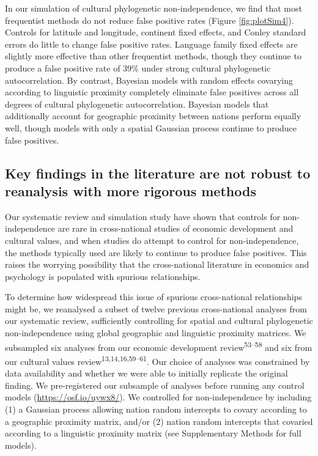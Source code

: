 \documentclass[
  man,floatsintext]{apa6}
\begin{document}
In our simulation of cultural phylogenetic non-independence, we find that most frequentist methods do not reduce false positive rates (Figure \ref{fig:plotSim4}). Controls for latitude and longitude, continent fixed effects, and Conley standard errors do little to change false positive rates. Language family fixed effects are slightly more effective than other frequentist methods, though they continue to produce a false positive rate of 39\% under strong cultural phylogenetic autocorrelation. By contrast, Bayesian models with random effects covarying according to linguistic proximity completely eliminate false positives across all degrees of cultural phylogenetic autocorrelation. Bayesian models that additionally account for geographic proximity between nations perform equally well, though models with only a spatial Gaussian process continue to produce false positives.

\hypertarget{key-findings-in-the-literature-are-not-robust-to-reanalysis-with-more-rigorous-methods}{%
\subsection{Key findings in the literature are not robust to reanalysis with more rigorous methods}\label{key-findings-in-the-literature-are-not-robust-to-reanalysis-with-more-rigorous-methods}}

Our systematic review and simulation study have shown that controls for non-independence are rare in cross-national studies of economic development and cultural values, and when studies do attempt to control for non-independence, the methods typically used are likely to continue to produce false positives. This raises the worrying possibility that the cross-national literature in economics and psychology is populated with spurious relationships.

To determine how widespread this issue of spurious cross-national relationships might be, we reanalysed a subset of twelve previous cross-national analyses from our systematic review, sufficiently controlling for spatial and cultural phylogenetic non-independence using global geographic and linguistic proximity matrices. We subsampled six analyses from our economic development review\textsuperscript{53--58} and six from our cultural values review\textsuperscript{13,14,16,59--61}. Our choice of analyses was constrained by data availability and whether we were able to initially replicate the original finding. We pre-registered our subsample of analyses before running any control models (\url{https://osf.io/uywx8/}). We controlled for non-independence by including (1) a Gaussian process allowing nation random intercepts to covary according to a geographic proximity matrix, and/or (2) nation random intercepts that covaried according to a linguistic proximity matrix (see Supplementary Methods for full models).
\end{document}
